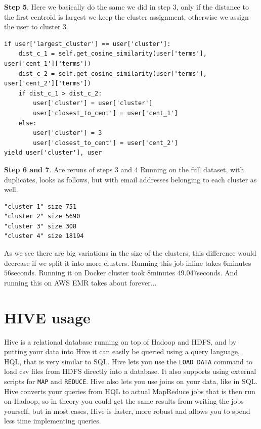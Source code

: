 \documentclass[runningheads,a4paper]{llncs}
\begin{document}
\textbf{Step 5}. Here we basically do the same we did in step 3, only if the distance to the first centroid is largest we keep the cluster assignment, otherwise we assign the user to cluster 3.
\begin{verbatim}
if user['largest_cluster'] == user['cluster']:
    dist_c_1 = self.get_cosine_similarity(user['terms'], user['cent_1']['terms'])
    dist_c_2 = self.get_cosine_similarity(user['terms'], user['cent_2']['terms'])
    if dist_c_1 > dist_c_2:
        user['cluster'] = user['cluster']
        user['closest_to_cent'] = user['cent_1']
    else:
        user['cluster'] = 3
        user['closest_to_cent'] = user['cent_2']
yield user['cluster'], user
\end{verbatim}
\textbf{Step 6 and 7}. Are reruns of steps 3 and 4
\newline
Running on the full dataset, with duplicates, looks as follows, but with email addresses belonging to each cluster as well.
\begin{verbatim}
"cluster 1"	size 751
"cluster 2"	size 5690
"cluster 3"	size 308
"cluster 4"	size 18194
\end{verbatim}
As we see there are big variations in the size of the clusters, this difference would decrease if we split it into more clusters.
\newline
Running this job inline takes $6$minutes $56$seconds. 
\newline
Running it on Docker cluster took 8minutes 49.047seconds.
\newline
And running this on AWS EMR takes about forever...
\section{HIVE usage}
\label{sec:hive}
Hive is a relational database running on top of Hadoop and HDFS, and by putting your data into Hive it can easily be queried using a query language, HQL, that is very similar to SQL. Hive lets you use the \verb!LOAD DATA! command to load csv files from HDFS directly into a database. It also supports using external scripts for \verb!MAP! and \verb!REDUCE!. Hive also lets you use joins on your data, like in SQL. \cite{oreilly} Hive converts your queries from HQL to actual MapReduce jobs that is then run on Hadoop, so in theory you could get the same results from writing the jobs yourself, but in most cases, Hive is faster, more robust and allows you to spend less time implementing queries.
\end{document}
